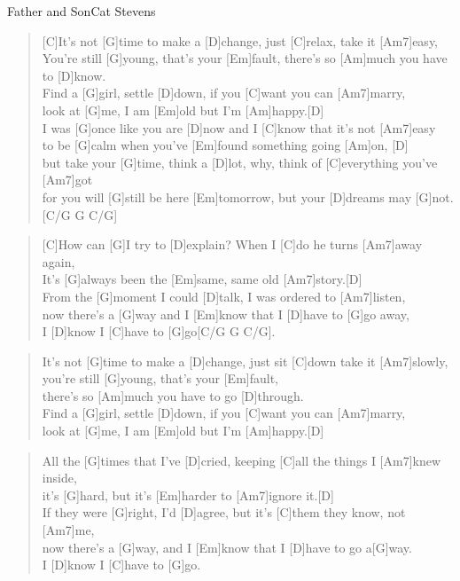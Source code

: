 \begin{song}{Father and Son}{Cat Stevens}

    \begin{verse}  
        [C]It's not [G]time to make a [D]change, just [C]relax, take it [Am7]easy, \\
        You're still [G]young, that's your [Em]fault, there's so [Am]much you have to [D]know. \\
        Find a [G]girl, settle [D]down, if you [C]want you can [Am7]marry, \\
        look at [G]me, I am [Em]old but I'm [Am]happy.[D] \\
        I was [G]once like you are [D]now and I [C]know that it's not [Am7]easy \\
        to be [G]calm when you've [Em]found something going [Am]on, [D] \\
        but take your [G]time, think a [D]lot, why, think of [C]everything you've [Am7]got \\
        for you will [G]still be here [Em]tomorrow, but your [D]dreams may [G]not.[C/G G C/G]
    \end{verse}  

    \begin{verse}  
        [C]How can [G]I try to [D]explain? When I [C]do he turns [Am7]away again, \\
        It's [G]always been the [Em]same, same old [Am7]story.[D] \\
        From the [G]moment I could [D]talk, I was ordered to [Am7]listen, \\
        now there's a [G]way and I [Em]know that I [D]have to [G]go away,\\
        I [D]know I [C]have to [G]go[C/G G C/G].
    \end{verse}  

    \begin{verse}  
        It's not [G]time to make a [D]change, just sit [C]down take it [Am7]slowly, \\
        you're still [G]young, that's your [Em]fault, \\
        there's so [Am]much you have to go [D]through. \\
        Find a [G]girl, settle [D]down, if you [C]want you can [Am7]marry, \\
        look at [G]me, I am [Em]old but I'm [Am]happy.[D]
    \end{verse}  

    \begin{verse}  
        All the [G]times that I've [D]cried, keeping [C]all the things I [Am7]knew inside, \\
        it's [G]hard, but it's [Em]harder to [Am7]ignore it.[D] \\
        If they were [G]right, I'd [D]agree, but it's [C]them they know, not [Am7]me,\\
        now there's a [G]way, and I [Em]know that I [D]have to go a[G]way. \\
        I [D]know I [C]have to [G]go. 
    \end{verse}  

\end{song}
